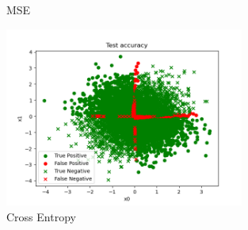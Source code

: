 \documentclass[12pt]{article}
\theoremstyle{definitionstyle}
\begin{document}
\begin{enumerate}
\begin{figure}[H]
            \caption{MSE}
            \includegraphics[width=0.7\textwidth]{ce_acc.png}
            \caption{Cross Entropy}
        \end{figure}
    \end{enumerate}
\end{document}
